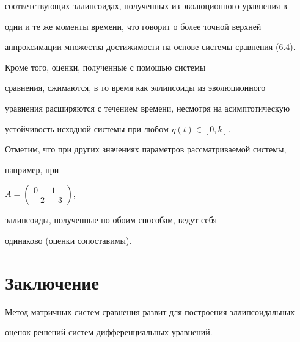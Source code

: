 соответствующих эллипсоидах, полученных из эволюционного уравнения в 


одни и те же моменты времени, что говорит о более точной верхней 


аппроксимации множества достижимости на основе системы сравнения (6.4). 


Кроме того, оценки, полученные с помощью системы 


сравнения, сжимаются, в то время как эллипсоиды из эволюционного 


уравнения расширяются с течением времени, несмотря на асимптотическую 


устойчивость исходной системы при любом $\eta(t)\in[0,k]$. 


 















 


Отметим, что при других значениях параметров рассматриваемой системы, 


например, при 


$A=\left(\begin{smallmatrix}0 & 1 \\-2 & -3 \end{smallmatrix}\right)$, 


эллипсоиды, полученные по обоим способам, ведут себя 


одинаково (оценки сопоставимы). 


 


\section*{Заключение} 


 


Метод матричных систем сравнения развит для построения эллипсоидальных


оценок решений систем дифференциальных уравнений. 



